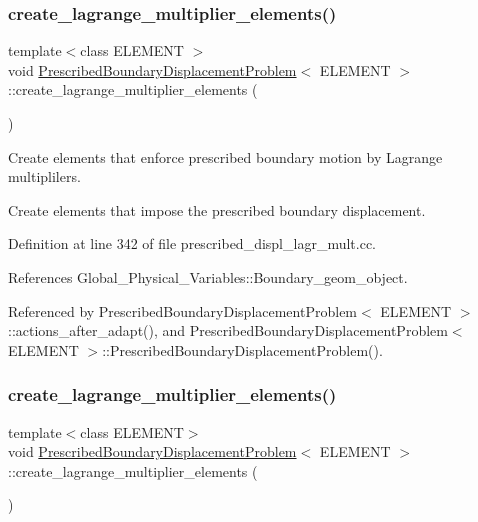 \subsubsection{\texorpdfstring{create\+\_\+lagrange\+\_\+multiplier\+\_\+elements()}{create\_lagrange\_multiplier\_elements()}\hspace{0.1cm}{\footnotesize\ttfamily [1/2]}}
{\footnotesize\ttfamily template$<$class E\+L\+E\+M\+E\+NT $>$ \\
void \hyperlink{classPrescribedBoundaryDisplacementProblem}{Prescribed\+Boundary\+Displacement\+Problem}$<$ E\+L\+E\+M\+E\+NT $>$\+::create\+\_\+lagrange\+\_\+multiplier\+\_\+elements (\begin{DoxyParamCaption}{ }\end{DoxyParamCaption})\hspace{0.3cm}{\ttfamily [private]}}



Create elements that enforce prescribed boundary motion by Lagrange multiplilers. 

Create elements that impose the prescribed boundary displacement. 

Definition at line 342 of file prescribed\+\_\+displ\+\_\+lagr\+\_\+mult.\+cc.



References Global\+\_\+\+Physical\+\_\+\+Variables\+::\+Boundary\+\_\+geom\+\_\+object.



Referenced by Prescribed\+Boundary\+Displacement\+Problem$<$ E\+L\+E\+M\+E\+N\+T $>$\+::actions\+\_\+after\+\_\+adapt(), and Prescribed\+Boundary\+Displacement\+Problem$<$ E\+L\+E\+M\+E\+N\+T $>$\+::\+Prescribed\+Boundary\+Displacement\+Problem().

\mbox{\label{classPrescribedBoundaryDisplacementProblem_adf4798f13809f5b2f2be6e3d63421edc}} 
\subsubsection{\texorpdfstring{create\+\_\+lagrange\+\_\+multiplier\+\_\+elements()}{create\_lagrange\_multiplier\_elements()}\hspace{0.1cm}{\footnotesize\ttfamily [2/2]}}
{\footnotesize\ttfamily template$<$class E\+L\+E\+M\+E\+NT$>$ \\
void \hyperlink{classPrescribedBoundaryDisplacementProblem}{Prescribed\+Boundary\+Displacement\+Problem}$<$ E\+L\+E\+M\+E\+NT $>$\+::create\+\_\+lagrange\+\_\+multiplier\+\_\+elements (\begin{DoxyParamCaption}{ }\end{DoxyParamCaption})\hspace{0.3cm}{\ttfamily [private]}}



